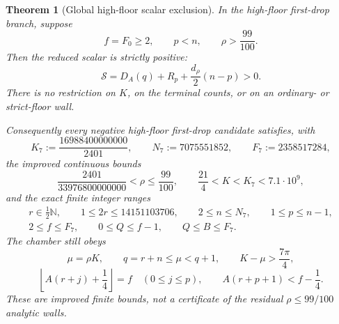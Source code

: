\documentclass[11pt]{article}
\newtheorem{theorem}{Theorem}[section]
\theoremstyle{remark}
\newcommand{\N}{\mathbb N}
\begin{document}
\begin{theorem}[Global high-floor scalar exclusion]
\label{thm:high-floor-global-scalar}
In the high-floor first-drop branch, suppose
\[
 f=F_0\geq2,\qquad p<n,\qquad \rho>\frac{99}{100}.
\]
Then the reduced scalar is strictly positive:
\begin{equation}
 \boxed{
 \mathcal S=D_A(q)+R_p+\frac{d_\rho}{2}(n-p)>0.}
 \label{eq:high-floor-global-positive}
\end{equation}
There is no restriction on $K$, on the terminal counts, or on an
ordinary- or strict-floor wall.

Consequently every negative high-floor first-drop candidate satisfies,
with
\[
 K_7:=\frac{16988400000000}{2401},\qquad
 N_7:=7075551852,\qquad F_7:=2358517284,
\]
the improved continuous bounds
\begin{equation}
 \boxed{
 \frac{2401}{33976800000000}<\rho\leq\frac{99}{100},
 \qquad \frac{21}{4}<K<K_7<7.1\mathbin{\cdot}10^9,}
 \label{eq:high-floor-round-seven-continuous}
\end{equation}
and the exact finite integer ranges
\begin{equation}
 \boxed{
 \begin{gathered}
 r\in\tfrac12\N,\qquad 1\leq2r\leq14151103706,\qquad
 2\leq n\leq N_7,\qquad 1\leq p\leq n-1,\\
 2\leq f\leq F_7,\qquad
 0\leq Q\leq f-1,\qquad Q\leq B\leq F_7.
 \end{gathered}}
 \label{eq:high-floor-round-seven-discrete}
\end{equation}
The chamber still obeys
\begin{equation}
 \mu=\rho K,\qquad q=r+n\leq\mu<q+1,\qquad
 K-\mu>\frac{7\pi}{4},
 \label{eq:high-floor-round-seven-chamber-one}
\end{equation}
\begin{equation}
 \left\lfloor A(r+j)+\frac14\right\rfloor=f
 \quad(0\leq j\leq p),\qquad
 A(r+p+1)<f-\frac14.
 \label{eq:high-floor-round-seven-chamber-two}
\end{equation}
These are improved finite bounds, not a certificate of the residual
$\rho\leq99/100$ analytic walls.
\end{theorem}
\end{document}
